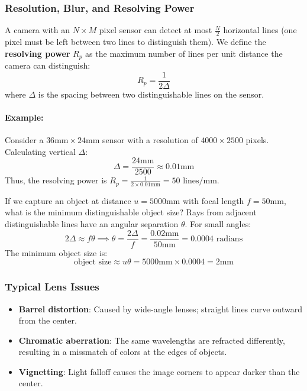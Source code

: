 \subsubsection{Resolution, Blur, and Resolving Power}
A camera with an $N \times M$ pixel sensor can detect at most $\frac{N}{2}$ horizontal lines (one pixel must be left between two lines to distinguish them). We define the \textbf{resolving power} $R_p$ as the maximum number of lines per unit distance the camera can distinguish:
\begin{equation}
    R_p = \frac{1}{2\Delta}
\end{equation}
where $\Delta$ is the spacing between two distinguishable lines on the sensor.

\paragraph{Example:}
Consider a $36\text{mm} \times 24\text{mm}$ sensor with a resolution of $4000 \times 2500$ pixels. Calculating vertical $\Delta$:
\begin{equation*}
    \Delta = \frac{24\text{mm}}{2500} \approx 0.01\text{mm}
\end{equation*}
Thus, the resolving power is $R_p = \frac{1}{2 \times 0.01\text{mm}} = 50 \text{ lines/mm}$.

If we capture an object at distance $u = 5000\text{mm}$ with focal length $f = 50\text{mm}$, what is the minimum distinguishable object size?
Rays from adjacent distinguishable lines have an angular separation $\theta$. For small angles:
\begin{equation*}
    2 \Delta \approx f \theta \implies \theta = \frac{2 \Delta}{f} = \frac{0.02\text{mm}}{50\text{mm}} = 0.0004 \text{ radians}
\end{equation*}
The minimum object size is:
\begin{equation*}
    \text{object size} \approx u \theta = 5000\text{mm} \times 0.0004 = 2\text{mm}
\end{equation*}

\subsubsection{Typical Lens Issues}
\begin{itemize}
    \item \textbf{Barrel distortion}: Caused by wide-angle lenses; straight lines curve outward from the center.
    \item \textbf{Chromatic aberration}: The same wavelengths are refracted differently, resulting in a missmatch of colors at the edges of objects.
    \item \textbf{Vignetting}: Light falloff causes the image corners to appear darker than the center.
\end{itemize}

